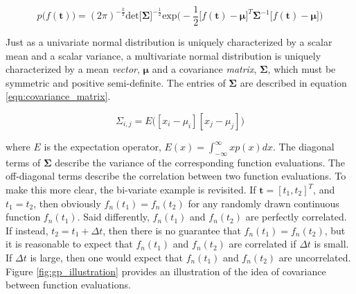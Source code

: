 \documentclass{article}
\begin{document}
 \begin{equation}
  \label{eqn:multivariate_gaussian}
  p\bigg(f(\boldsymbol{t}) \bigg) =
  (2\pi)^{-\frac{k}{2}}\text{det}\big[\boldsymbol{\Sigma}\big]^{-\frac{1}{2}}\text{exp}\bigg(-\frac{1}{2}\big[f(\boldsymbol{t}) - \boldsymbol{\mu}\big]^T \boldsymbol{\Sigma}^{-1}\big[f(\boldsymbol{t}) - \boldsymbol{\mu}\big] \bigg)
\end{equation}



\noindent Just as a univariate normal distribution is uniquely characterized by a scalar mean and a scalar variance, a multivariate normal distribution is uniquely characterized by a mean \textit{vector}, $\boldsymbol{\mu}$  and a covariance \textit{matrix}, $\boldsymbol{\Sigma}$, which must be symmetric and positive semi-definite. The entries of $\boldsymbol{\Sigma}$ are described in equation \ref{eqn:covariance_matrix}.

 \begin{equation}
  \label{eqn:covariance_matrix}
  \Sigma_{i,j} = E\bigg([x_i- \mu_i][x_j - \mu_j] \bigg)
\end{equation}

\noindent where $E$ is the expectation operator, $E(x) =  \int_{-\infty}^{\infty} xp(x) dx$. The diagonal terms of  $\boldsymbol{\Sigma}$ describe the variance of the corresponding function evaluations. The off-diagonal terms describe the correlation between two function evaluations. To make this more clear, the bi-variate example is revisited. If $\boldsymbol{t} = [t_1, t_2]^T$, and $t_1 = t_2$, then obviously $f_n(t_1) = f_n(t_2)$ for any randomly drawn continuous function $f_n(t_1)$. Said differently, $f_n(t_1)$ and $f_n(t_2)$ are perfectly correlated. If instead, $t_2 = t_1 + \Delta t$, then there is no guarantee that $f_n(t_1) = f_n(t_2)$, but it is reasonable to expect that $f_n(t_1)$ and $f_n(t_2)$ are correlated if $\Delta t$ is small. If $\Delta t$ is large, then one would expect that $f_n(t_1)$ and $f_n(t_2)$ are uncorrelated. Figure \ref{fig:gp_illustration} provides an illustration of the idea of covariance between function evaluations. 
\end{document}

